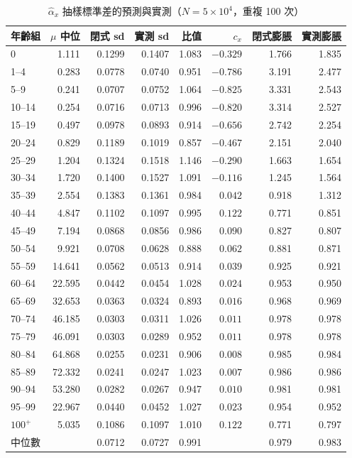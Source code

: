 \documentclass[UTF8, fontset=macnew, a4paper, 12pt]{ctexart}
\begin{document}
\begin{table}[H]
\centering
\caption{$\hat\alpha_x$ 抽樣標準差的預測與實測（$N=5\times10^{4}$，重複 100 次）}
\small
\begin{tabular}{lrrrrrrr}
\toprule
年齡組 & $\mu$ 中位 & 閉式 sd & 實測 sd & 比值 & $c_x$ & 閉式膨脹 & 實測膨脹\\
\midrule
0        & 1.111  & 0.1299 & 0.1407 & 1.083 & $-0.329$ & 1.766 & 1.835\\
1--4     & 0.283  & 0.0778 & 0.0740 & 0.951 & $-0.786$ & 3.191 & 2.477\\
5--9     & 0.241  & 0.0707 & 0.0752 & 1.064 & $-0.825$ & 3.331 & 2.543\\
10--14   & 0.254  & 0.0716 & 0.0713 & 0.996 & $-0.820$ & 3.314 & 2.527\\
15--19   & 0.497  & 0.0978 & 0.0893 & 0.914 & $-0.656$ & 2.742 & 2.254\\
20--24   & 0.829  & 0.1189 & 0.1019 & 0.857 & $-0.467$ & 2.151 & 2.040\\
25--29   & 1.204  & 0.1324 & 0.1518 & 1.146 & $-0.290$ & 1.663 & 1.654\\
30--34   & 1.720  & 0.1400 & 0.1527 & 1.091 & $-0.116$ & 1.245 & 1.564\\
35--39   & 2.554  & 0.1383 & 0.1361 & 0.984 & $0.042$  & 0.918 & 1.312\\
40--44   & 4.847  & 0.1102 & 0.1097 & 0.995 & $0.122$  & 0.771 & 0.851\\
45--49   & 7.194  & 0.0868 & 0.0856 & 0.986 & $0.090$  & 0.827 & 0.807\\
50--54   & 9.921  & 0.0708 & 0.0628 & 0.888 & $0.062$  & 0.881 & 0.871\\
55--59   & 14.641 & 0.0562 & 0.0513 & 0.914 & $0.039$  & 0.925 & 0.921\\
60--64   & 22.595 & 0.0442 & 0.0454 & 1.028 & $0.024$  & 0.953 & 0.950\\
65--69   & 32.653 & 0.0363 & 0.0324 & 0.893 & $0.016$  & 0.968 & 0.969\\
70--74   & 46.185 & 0.0303 & 0.0311 & 1.026 & $0.011$  & 0.978 & 0.978\\
75--79   & 46.091 & 0.0303 & 0.0289 & 0.952 & $0.011$  & 0.978 & 0.978\\
80--84   & 64.868 & 0.0255 & 0.0231 & 0.906 & $0.008$  & 0.985 & 0.984\\
85--89   & 72.332 & 0.0241 & 0.0247 & 1.023 & $0.007$  & 0.986 & 0.986\\
90--94   & 53.280 & 0.0282 & 0.0267 & 0.947 & $0.010$  & 0.981 & 0.981\\
95--99   & 22.967 & 0.0440 & 0.0452 & 1.027 & $0.023$  & 0.954 & 0.952\\
$100^{+}$& 5.035  & 0.1086 & 0.1097 & 1.010 & $0.122$  & 0.771 & 0.797\\
\midrule
中位數    &        & 0.0712 & 0.0727 & 0.991 &          & 0.979 & 0.983\\
\bottomrule
\end{tabular}
\label{tab:v2}
\end{table}
\end{document}

